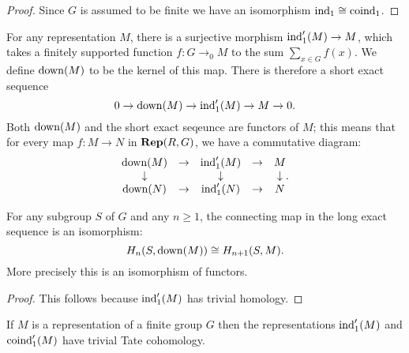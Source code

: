 \begin{proof}
	Since $G$ is assumed to be finite we have an isomorphism $\mathrm{ind}_1 \cong \mathrm{coind}_1$.
	\leanok
\end{proof}

\begin{definition} \label{def:down}
	For any representation $M$, there is a surjective morphism $\mathrm{ind}_1'(M) \to M$,
	which takes a finitely supported function $f : G \to_0 M$ to the sum $\sum_{x \in G} f (x)$.
	We define $\mathrm{down}(M)$ to be the kernel of this map.
	There is therefore a short exact sequence
	\[
		0 \to \mathrm{down}(M) \to \mathrm{ind}_1'(M) \to M \to 0.
	\]
	Both $\mathrm{down}(M)$ and the short exact seqeunce are functors of $M$; this means that for
	every map $f : M \to N$ in $\mathbf{Rep}(R,G)$, we have a commutative diagram:
	\[
		\begin{matrix}
			\mathrm{down}(M) &\to &\mathrm{ind}_1'(M)& \to& M \\
			\downarrow && \downarrow && \downarrow \\
			\mathrm{down}(N) &\to &\mathrm{ind}_1'(N)& \to& N
		\end{matrix} .
	\]
\end{definition}

\begin{lemma}	\label{lem:down iso}
	\leanok
	For any subgroup $S$ of $G$ and any $n \ge 1$, the connecting
	map in the long exact sequence is an isomorphism:
	\[
		H_{n}(S,\mathrm{down}(M)) \cong H_{n+1}(S,M).
	\]
	More precisely this is an isomorphism of functors.
\end{lemma}

\begin{proof}
	This follows because $\mathrm{ind}_1'(M)$ has trivial homology.
\end{proof}

\begin{lemma} \label{lem:induced' trivial Tate}
	\leanok
	If $M$ is a representation of a finite group $G$ then the representations
	$\mathrm{ind}_1'(M)$ and $\mathrm{coind}_1'(M)$ have trivial Tate cohomology.
\end{lemma}

